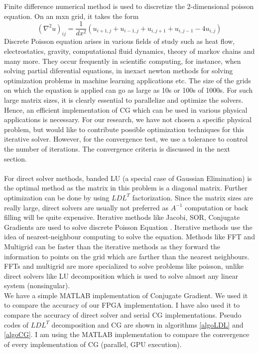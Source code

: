 \documentclass{article}
\begin{document}
\begin{spacing}{1.1}
Finite difference numerical method is used to discretize the 2-dimensional poisson equation. On an m{x}n grid, it takes the form
\[(\nabla^2	u)_{ij} = \dfrac{1}{dx^2}(u_{i+1,j} + u_{i-1,j} + u_{i,j+1} + u_{i,j-1} - 4u_{i,j} ) \] 
Discrete Poisson equation arises in various fields of study such as heat flow, electrostatics, gravity, computational fluid dynamics, theory of markov chains and many more. They occur frequently in scientific computing, for instance, when solving partial diferential equations, in inexact newton methods for solving optimization problems in machine learning applications etc. The size of the grids on which the equation is applied can go as large as 10s or 100s of 1000s. For such large matrix sizes, it is clearly essential to parallelize and optimize the solvers. Hence, an efficient implementation of CG which can be used in various physical applications is necessary. For our research, we have not chosen a specific physical problem, but would like to contribute possible optimization techniques for this iterative solver. However, for the convergence test, we use a tolerance to control the number of iterations. The convergence criteria is discussed in the next section.\\
\\
	For direct solver methods, banded LU (a special case of Gaussian Elimination) is the optimal method as the matrix in this problem is a diagonal matrix. Further optimization can be done by using $LDL^T$ factorization.
	Since the matrix sizes are really large, direct solvers are usually not preferred as $A^{-1}$ computation or back filling will be quite expensive. Iterative methods like  Jacobi, SOR, Conjugate Gradients are used to solve discrete Poisson Equation \cite{Berkley1996} . Iterative methods use the idea of nearest-neighbour computing to solve the equation. Methods like FFT and Multigrid can be faster than the iterative methods as they forward the information to points on the grid which are farther than the nearest neighbours. FFTs and multigrid are more specialized to solve problems like poisson, unlike direct solvers like LU decomposition which is used to solve almost any linear system (nonsingular). \cite{FFTPoisson}
\\
	We have a simple MATLAB implementation of Conjugate Gradient. We used it to compare the accuracy of our FPGA implementation. I have also used it to compare the accuracy of direct solver and serial CG implementations. Pseudo codes of $LDL^T$ decomposition and CG are shown in algorithms \ref{algoLDL} and \ref{algoCG}. I am using the MATLAB implementation to compare the convergence of every implementation of CG (parallel, GPU execution).

\end{spacing}
\end{document}
